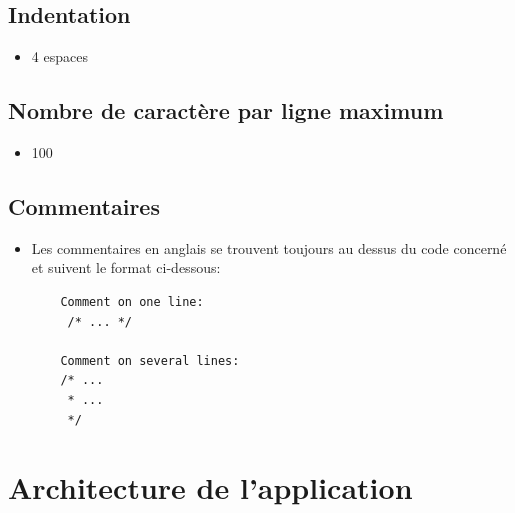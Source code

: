 \documentclass[10pt,a4paper]{article}
\begin{document}
\subsection{Indentation}
\begin{itemize}
\item 4 espaces
\end{itemize}   

\subsection{Nombre de caractère par ligne maximum}  
\begin{itemize}
\item 100
\end{itemize}  

\subsection{Commentaires}
\begin{itemize}
\item Les commentaires en anglais se trouvent toujours au dessus du code concerné et suivent le format ci-dessous:
	\begin{lstlisting}
	Comment on one line:
	 /*	...	*/
	 
	Comment on several lines:
	/* ...
	 * ...
	 */
	\end{lstlisting}
\end{itemize}

\section{Architecture de l'application}
\end{document}
